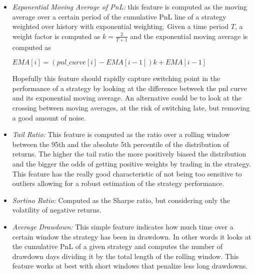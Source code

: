 \begin{itemize}
	\item \textit{Exponential Moving Average of PnL:} this feature is computed as the moving average over a certain period of the cumulative PnL line of a strategy weighted over history with exponential weighting. Given a time period $T$, a weight factor is computed as $k = \frac{2}{T+1}$ and the exponential moving average is computed as\\
	
	\begin{center} 
		$\displaystyle EMA[i] =  \left(pnl\_curve[i] - EMA[i-1]\right)k + EMA[i-1]$
	\end{center}
	
	Hopefully this feature should rapidly capture switching point in the performance of a strategy by looking at the difference betweek the pnl curve and its exponential moving average. An alternative could be to look at the crossing between moving averages, at the risk of switching late, but removing a good amount of noise.\\
	
	\item \textit{Tail Ratio:} This feature is computed as the ratio over a rolling window between the 95th and the absolute 5th percentile of the distribution of returns. The higher the tail ratio the more positively biased the distribution and the bigger the odds of getting positive weights by trading in the strategy. This feature has the really good characteristic of not being too sensitive to outliers allowing for a robust estimation of the strategy performance.\\
	
	\item \textit{Sortino Ratio:} Computed as the Sharpe ratio, but considering only the volatility of negative returns.\\ 
	
	\item \textit{Average Drawdown:} This simple feature indicates how much time over a certain window the strategy has been in drawdown. In other words it looks at the cumulative PnL of a given strategy and computes the number of drawdown days dividing it by the total length of the rolling window. This feature works at best with short windows that penalize less long drawdowns.\\
	 
\end{itemize}